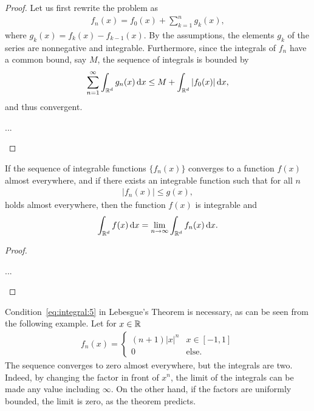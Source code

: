 \begin{proof}
  Let us first rewrite the problem as
  \begin{gather*}
    f_n(x) = f_0(x) + \sum_{k=1}^n g_k(x),
  \end{gather*}
  where $g_k(x) = f_k(x) - f_{k-1}(x)$. By the assumptions, the
  elements $g_k$ of the series are nonnegative and
  integrable. Furthermore, since the integrals of $f_n$ have a common
  bound, say $M$, the sequence of integrals is bounded by
  \begin{gather*}
    \sum_{n=1}^\infty \int_{\mathbb R^d} g_n(x)\,\mathrm{d} x
    \le M + \int_{\mathbb R^d} |f_0(x)|\,\mathrm{d} x,
  \end{gather*}
  and thus convergent.
  \begin{todo}
    ...
  \end{todo}
\end{proof}

\begin{theorem}[Lebesgue]
  If the sequence of integrable functions $\{f_n(x)\}$ converges
  to a function $f(x)$ almost everywhere, and if there exists an
  integrable function such that for all $n$
  \begin{gather}
    \label{eq:integral:5}
    \bigl|f_n(x)\bigr| \le g(x),
  \end{gather}
  holds almost everywhere, then the function $f(x)$ is integrable and
  \begin{gather*}
    \int_{\mathbb R^d} f(x)\,\mathrm{d} x = \lim_{n\to\infty} \int_{\mathbb R^d} f_n(x)\,\mathrm{d} x.
  \end{gather*}
\end{theorem}

\begin{proof}
  \begin{todo}
    ...
  \end{todo}
\end{proof}

\begin{example}
  Condition~\eqref{eq:integral:5} in Lebesgue's Theorem is necessary,
  as can be seen from the following example. Let for $x\in \mathbb R$
  \begin{gather*}
    f_n(x) =
    \begin{cases}
      (n+1) |x|^n & x\in [-1,1] \\
      0 & \text{else}.
    \end{cases}
  \end{gather*}
  The sequence converges to zero almost everywhere, but the integrals
  are two. Indeed, by changing the factor in front of $x^n$, the limit
  of the integrals can be made any value including $\infty$. On the
  other hand, if the factors are uniformly bounded, the limit is zero,
  as the theorem predicts.
\end{example}

